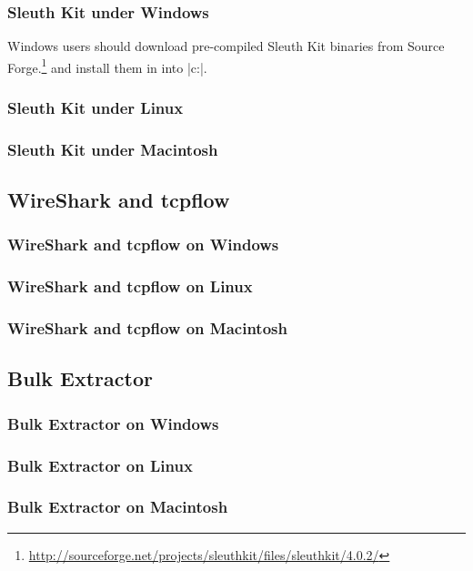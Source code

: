 \begin{itemize}
\subsubsection{Sleuth Kit under Windows}
Windows users should download pre-compiled Sleuth Kit binaries from Source
Forge.\footnote{\url{http://sourceforge.net/projects/sleuthkit/files/sleuthkit/4.0.2/}}
and install them in into |c:\sleuthkit|.

\subsubsection{Sleuth Kit under Linux}

\subsubsection{Sleuth Kit under Macintosh}

\subsection{WireShark and tcpflow}

\subsubsection{WireShark and tcpflow on Windows}
\subsubsection{WireShark and tcpflow on Linux}
\subsubsection{WireShark and tcpflow on Macintosh}

\subsection{Bulk Extractor}

\subsubsection{Bulk Extractor on Windows}
\subsubsection{Bulk Extractor on Linux}
\subsubsection{Bulk Extractor on Macintosh}


\end{itemize}
